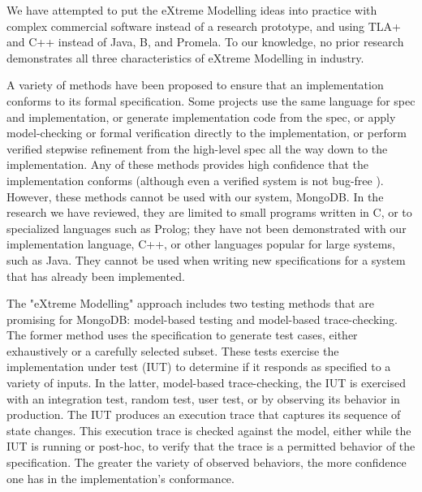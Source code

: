 \documentclass{vldb}
\begin{document}

We have attempted to put the eXtreme Modelling ideas into practice with complex commercial software instead of a research prototype, and using TLA+ and C++ instead of Java, B, and Promela. To our knowledge, no prior research demonstrates all three characteristics of eXtreme Modelling in industry.

A variety of methods have been proposed to ensure that an implementation conforms to its formal specification.
Some projects use the same language for spec and implementation\cite{KerGre99},
or generate implementation code from the spec\cite{Houhou17CodeGenerationFromSpecification},
or apply model-checking or formal verification directly to the implementation\cite{Holzmann04ModelDrivenVerification},
or perform verified stepwise refinement from the high-level spec all the way down to the implementation\cite{Eiriksson95UsingFormalVerification}.
Any of these methods provides high confidence that the implementation conforms (although even a verified system is not bug-free \cite{Fonseca17EmpiricalStudy}). 
However, these methods cannot be used with our system, MongoDB.
In the research we have reviewed, they are limited to small programs written in C, or to specialized languages such as Prolog; they have not been demonstrated with our implementation language, C++, or other languages popular for large systems, such as Java.
They cannot be used when writing new specifications for a system that has already been implemented.

The "eXtreme Modelling" approach includes two testing methods that are promising for MongoDB: model-based testing\cite{Utting06PracticalModelBasedTesting} and model-based trace-checking\cite{Jard83AnApproachToTestingSpecifications, MBTC}. The former method uses the specification to generate test cases, either exhaustively or a carefully selected subset\cite{Dick93AutomatingGenerationOfTests}.
These tests exercise the implementation under test (IUT) to determine if it responds as specified to a variety of inputs.
In the latter, model-based trace-checking, the IUT is exercised with an integration test, random test, user test, or by observing its behavior in production.
The IUT produces an execution trace that captures its sequence of state changes.
This execution trace is checked against the model, either while the IUT is running or post-hoc, to verify that the trace is a permitted behavior of the specification.
The greater the variety of observed behaviors, the more confidence one has in the implementation's conformance.
\end{document}
